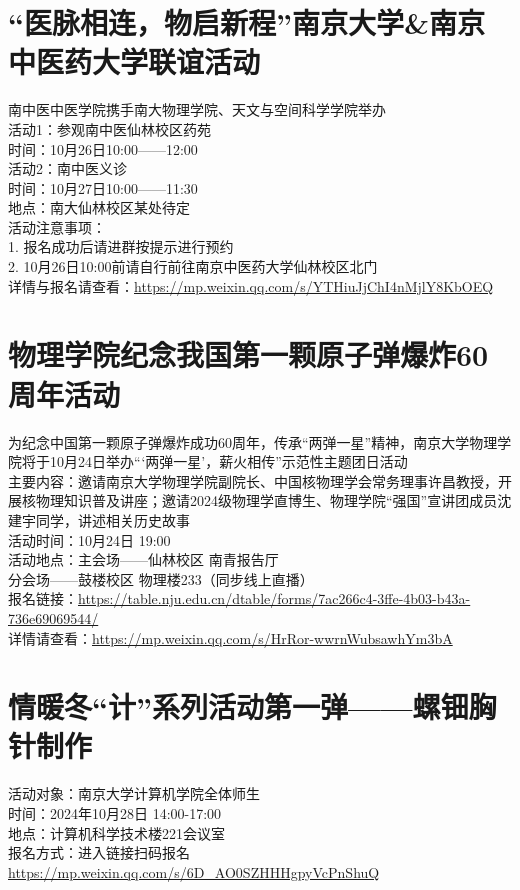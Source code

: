 \documentclass[letterpaper, 12pt]{article}
\begin{document}
\begin{multicols}{2}
\section{“医脉相连，物启新程”南京大学\&南京中医药大学联谊活动}
南中医中医学院携手南大物理学院、天文与空间科学学院举办\\
活动1：参观南中医仙林校区药苑\\
时间：10月26日10:00——12:00\\
活动2：南中医义诊\\
时间：10月27日10:00——11:30\\
地点：南大仙林校区某处待定\\
活动注意事项：\\
1. 报名成功后请进群按提示进行预约\\
2. 10月26日10:00前请自行前往南京中医药大学仙林校区北门\\
详情与报名请查看：\url{https://mp.weixin.qq.com/s/YTHiuJjChI4nMjlY8KbOEQ}\\
\section{物理学院纪念我国第一颗原子弹爆炸60周年活动}
为纪念中国第一颗原子弹爆炸成功60周年，传承“两弹一星”精神，南京大学物理学院将于10月24日举办“‘两弹一星’，薪火相传”示范性主题团日活动\\
主要内容：邀请南京大学物理学院副院长、中国核物理学会常务理事许昌教授，开展核物理知识普及讲座；邀请2024级物理学直博生、物理学院“强国”宣讲团成员沈建宇同学，讲述相关历史故事\\
活动时间：10月24日 19:00\\
活动地点：主会场——仙林校区 南青报告厅 \\
分会场——鼓楼校区 物理楼233（同步线上直播）\\
报名链接：\url{https://table.nju.edu.cn/dtable/forms/7ac266c4-3ffe-4b03-b43a-736e69069544/}\\
详情请查看：\url{https://mp.weixin.qq.com/s/HrRor-wwrnWubsawhYm3bA}\\
\section{情暖冬“计”系列活动第一弹——螺钿胸针制作}
活动对象：南京大学计算机学院全体师生\\
时间：2024年10月28日 14:00-17:00\\
地点：计算机科学技术楼221会议室\\
报名方式：进入链接扫码报名\url{https://mp.weixin.qq.com/s/6D_AO0SZHHHgpyVcPnShuQ}



\end{multicols}
\end{document}
